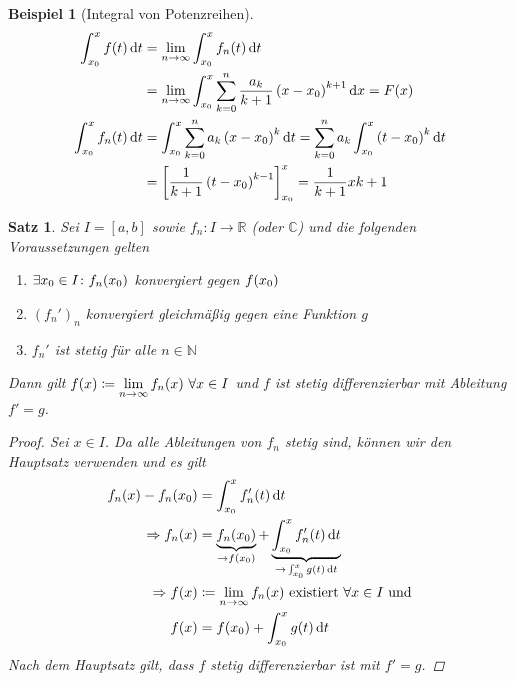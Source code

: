 \documentclass[11pt, twoside, a4paper]{article}
\theoremstyle{plain}
\newtheorem{satz}[blockelement]{Satz}
\newtheorem{beispiel}[blockelement]{Beispiel}
\numberwithin{equation}{subsection}
\newcommand{\pair}[1]{\left(#1\right)}
\newcommand{\of}[1]{\mathopen{}\mathclose{}\bgroup\left(#1\aftergroup\egroup\right)}
\newcommand{\interv}[1]{\left[#1\right]}
\newcommand{\impl}[0]{\Rightarrow{}}
\newcommand{\fromto}{\rightarrow{}}
\newcommand{\dif}{\mathop{}\!\mathrm{d}}
\newcommand{\ntoinf}[0]{n\fromto\infty}
\newcommand{\R}{\mathbb{R}}
\newcommand{\N}{\mathbb{N}}
\newcommand{\C}{\mathbb{C}}
\begin{document}
\begin{beispiel}[Integral von Potenzreihen]
\begin{align*}
            \int_{x_0}^{x} f\of{t} \dif t &= \lim_{\ntoinf} \int_{x_0}^{x} f_n\of{t} \dif t\\
            &= \lim_{\ntoinf} \int_{x_0}^{x} \sum_{k=0}^{n} \frac{a_k}{k+1}\pair{x-x_0}^{k+1} \dif x = F(x)\\
            \int_{x_0}^{x} f_n\of{t} \dif t &= \int_{x_0}^{x} \sum_{k=0}^{n} a_k\pair{x-x_0}^k \dif t = \sum_{k=0}^{n} a_k \int_{x_0}^{x} \pair{t-x_0}^k \dif t\\
            &= \interv{\frac{1}{k+1}\pair{t-x_0}^{k-1}}_{x_0}^{x} = \frac{1}{k+1}x{k+1}
        \end{align*}
    \end{beispiel}

    \begin{satz}
        Sei $I=\interv{a,b}$ sowie $f_n: I\fromto\R$ (oder $\C$) und die folgenden Voraussetzungen gelten
        \begin{enumerate}[label=(\roman*)]
            \item $\exists x_0\in I\colon f_n\of{x_0}$ konvergiert gegen $f\of{x_0}$
            \item $\pair{f_n'}_n$ konvergiert gleichmäßig gegen eine Funktion $g$
            \item $f_n'$ ist stetig für alle $n\in\N$
        \end{enumerate}
        Dann gilt $f(x) \coloneqq \displaystyle\lim_{\ntoinf} f_n\of{x}~\forall x\in I$ und $f$ ist stetig differenzierbar mit Ableitung $f' = g$.
        \begin{proof}
            Sei $x\in I$. Da alle Ableitungen von $f_n$ stetig sind, können wir den Hauptsatz verwenden und es gilt
            \begin{align*}
                f_n\of{x} - f_n\of{x_0} &= \int_{x_0}^{x} f_n'\of{t} \dif t\\
                \impl f_n\of{x} &= \underbrace{f_n\of{x_0}}_{\fromto f\of{x_0}} + \underbrace{\int_{x_0}^{x} f_n'\of{t} \dif t}_{\fromto \int_{x_0}^{x} g\of{t} \dif t}\\
                \impl f\of{x} &\coloneqq \lim_{\ntoinf} f_n\of{x} \text{ existiert } \forall x\in I \text{ und}\\
                f\of{x} &= f\of{x_0} + \int_{x_0}^{x} g\of{t} \dif t
            \end{align*}
            Nach dem Hauptsatz gilt, dass $f$ stetig differenzierbar ist mit $f' = g$.
        \end{proof}
    \end{satz}
\end{document}
